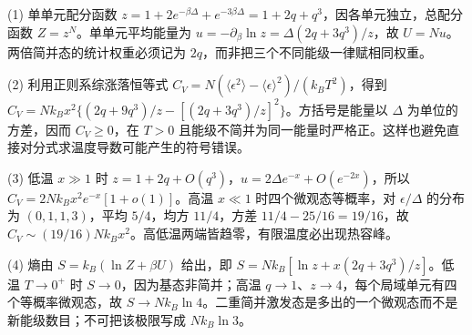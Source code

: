 (1) 单单元配分函数 \(z=1+2e^{-\beta\Delta}+e^{-3\beta\Delta}=1+2q+q^3\)，因各单元独立，总配分函数 \(Z=z^N\)。单单元平均能量为 \(u=-\partial_\beta\ln z=\Delta(2q+3q^3)/z\)，故 \(U=Nu\)。两倍简并态的统计权重必须记为 \(2q\)，而非把三个不同能级一律赋相同权重。

(2) 利用正则系综涨落恒等式 \(C_V=N(\langle\epsilon^2\rangle-\langle\epsilon\rangle^2)/(k_BT^2)\)，得到 \(C_V=Nk_Bx^2\{(2q+9q^3)/z-[(2q+3q^3)/z]^2\}\)。方括号是能量以 \(\Delta\) 为单位的方差，因而 \(C_V\ge0\)，在 \(T>0\) 且能级不简并为同一能量时严格正。这样也避免直接对分式求温度导数可能产生的符号错误。

(3) 低温 \(x\gg1\) 时 \(z=1+2q+O(q^3)\)，\(u=2\Delta e^{-x}+O(e^{-2x})\)，所以 \(C_V=2Nk_Bx^2e^{-x}[1+o(1)]\)。高温 \(x\ll1\) 时四个微观态等概率，对 \(\epsilon/\Delta\) 的分布为 \((0,1,1,3)\)，平均 \(5/4\)，均方 \(11/4\)，方差 \(11/4-25/16=19/16\)，故 \(C_V\sim(19/16)Nk_Bx^2\)。高低温两端皆趋零，有限温度必出现热容峰。

(4) 熵由 \(S=k_B(\ln Z+\beta U)\) 给出，即 \(S=Nk_B[\ln z+x(2q+3q^3)/z]\)。低温 \(T\to0^+\) 时 \(S\to0\)，因为基态非简并；高温 \(q\to1\)、\(z\to4\)，每个局域单元有四个等概率微观态，故 \(S\to Nk_B\ln4\)。二重简并激发态是多出的一个微观态而不是新能级数目；不可把该极限写成 \(Nk_B\ln3\)。
